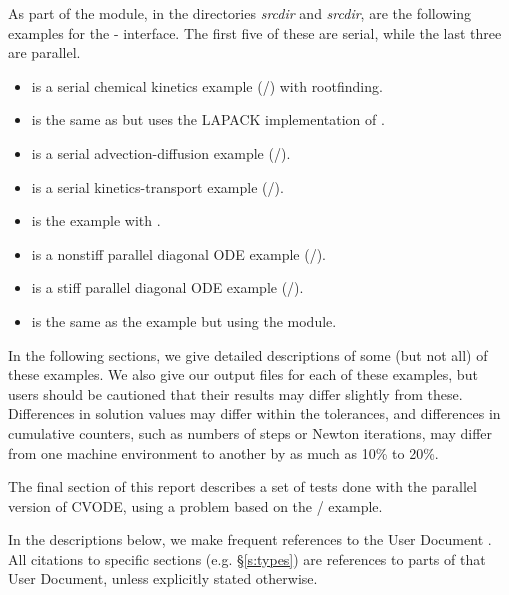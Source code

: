\vspace{0.2in}\noindent
As part of the {\fcvode} module, in the directories
{\em srcdir} and
{\em srcdir}, are the following examples for
the {\F}-{\CC} interface.  The first five of these are serial, while
the last three are parallel.
\begin{itemize}
\item {} is a serial chemical kinetics example (/{\sunlinsoldense})
  with rootfinding.
\item {} is the same as  but uses the LAPACK
  implementation of {\sunlinsollapdense}.
\item {} is a serial advection-diffusion example (/{\sunlinsolband}).
\item {} is a serial kinetics-transport example (/{\sunlinsolspgmr}).
\item {} is the  example with {\fcvbp}.
\item {} is a nonstiff parallel diagonal ODE example
  (/).
\item {} is a stiff parallel diagonal ODE example (/{\sunlinsolspgmr}).
\item {} is the same as the  example
       but using the {\fcvbbd} module.
\end{itemize}

\vspace{0.2in}\noindent
In the following sections, we give detailed descriptions of some (but
not all) of these examples.  We also give our output files for
each of these examples, but users should be cautioned that their
results may differ slightly from these.  Differences in solution
values may differ within the tolerances, and differences in cumulative
counters, such as numbers of steps or Newton iterations, may differ
from one machine environment to another by as much as 10\% to 20\%.

The final section of this report describes a set of tests done with the
parallel version of CVODE, using a problem based on the
/ example.

In the descriptions below, we make frequent references to the {\cvode}
User Document \cite{cvode_ug}.  All citations to specific sections
(e.g. \S\ref{s:types}) are references to parts of that User Document, unless
explicitly stated otherwise.

